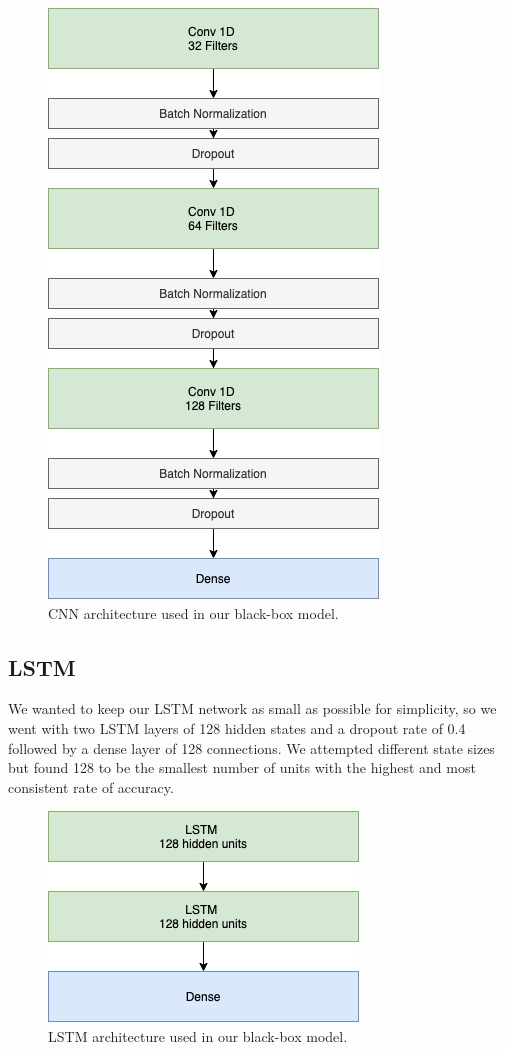 \documentclass{turabian-thesis}
\begin{document}
\begin{figure}[h!]
   \begin{center}
      \includegraphics[scale=0.6]{../media/cnn_model.png}
   \end{center}
   \caption{CNN architecture used in our black-box model.}  
    \label{fig:cnn_model}
\end{figure}

\subsection{LSTM}
We wanted to keep our LSTM network as small as possible for simplicity, so we went with two LSTM layers of 128 hidden states and a dropout rate of 0.4  followed by a dense layer of 128 connections. We attempted different state sizes but found 128 to be the smallest number of units with the highest and most consistent rate of accuracy.

\begin{figure}[h!]
   \begin{center}
      \includegraphics[scale=0.6]{../media/lstm_model.png}
   \end{center}
   \caption{LSTM architecture used in our black-box model.}
   \label{fig:lstm_model}
\end{figure}
\end{document}
